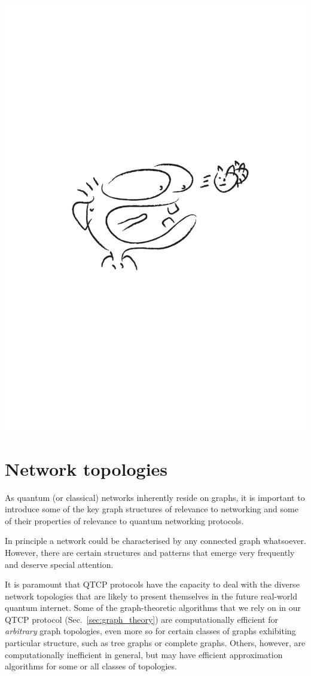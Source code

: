 \documentclass[aps, rmp, twocolumn, amsmath, amssymb, nofootinbib, superscriptaddress, longbibliography, floatfix, table-of-contents, eqsecnum]{revtex4-1}
\begin{document}
\begin{center}
	\includegraphics[width=0.6\columnwidth]{sketch_19}
\end{center}

%
%

\section{Network topologies} 

As quantum (or classical) networks inherently reside on graphs, it is important to introduce some of the key graph structures of relevance to networking and some of their properties of relevance to quantum networking protocols.

In principle a network could be characterised by any connected graph whatsoever. However, there are certain structures and patterns that emerge very frequently and deserve special attention.

It is paramount that QTCP protocols have the capacity to deal with the diverse network topologies that are likely to present themselves in the future real-world quantum internet. Some of the graph-theoretic algorithms that we rely on in our QTCP protocol (Sec.~\ref{sec:graph_theory}) are computationally efficient for \textit{arbitrary} graph topologies, even more so for certain classes of graphs exhibiting particular structure, such as tree graphs or complete graphs. Others, however, are computationally inefficient in general, but may have efficient approximation algorithms for some or all classes of topologies.
\end{document}
